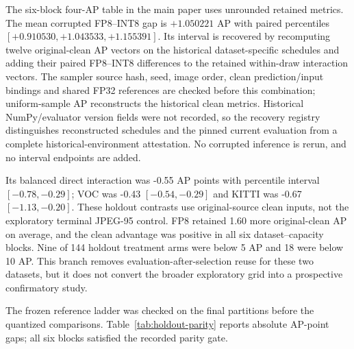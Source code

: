 \documentclass[10pt]{article}
\begin{document}
The six-block four-AP table in the main paper uses unrounded retained metrics.
The mean corrupted FP8--INT8 gap is $+1.050221$ AP with paired percentiles
$[+0.910530,+1.043533,+1.155391]$. Its interval is recovered by recomputing
twelve original-clean AP vectors on the historical dataset-specific schedules
and adding their paired FP8--INT8 differences to the retained within-draw
interaction vectors. The sampler source hash, seed, image order, clean
prediction/input bindings and shared FP32 references are checked before this
combination; uniform-sample AP reconstructs the historical clean metrics.
Historical NumPy/evaluator version fields were not recorded, so the recovery
registry distinguishes reconstructed schedules and the pinned current
evaluation from a complete historical-environment attestation. No corrupted
inference is rerun, and no interval endpoints are added.

Its balanced direct interaction was -0.55 AP points with percentile interval
$[-0.78,-0.29]$; VOC was -0.43 $[-0.54,-0.29]$ and KITTI was -0.67
$[-1.13,-0.20]$. These holdout contrasts use original-source clean inputs, not
the exploratory terminal JPEG-95 control. FP8 retained 1.60 more original-clean AP on average, and the
clean advantage was positive in all six dataset--capacity blocks. Nine of 144
holdout treatment arms were below 5 AP and 18 were below 10 AP. This branch
removes evaluation-after-selection reuse for these two datasets, but it does
not convert the broader exploratory grid into a prospective confirmatory study.

\begin{table}[htbp]
\centering
\caption{Selection-disjoint partition counts. The KITTI final set is a
class-covered subset of the post-selection remainder, not 20\% of the complete
7,481-image labeled universe.}
\label{tab:holdout-splits}
\small
\resizebox{0.88\textwidth}{!}{}
\end{table}

The frozen reference ladder was checked on the final partitions before the
quantized comparisons. Table~\ref{tab:holdout-parity} reports absolute AP-point
gaps; all six blocks satisfied the recorded parity gate.

\begin{table}[htbp]
\centering
\caption{Selection-disjoint reference-ladder parity. Values are absolute
AP-point gaps between the named implementations.}
\label{tab:holdout-parity}
\small
\resizebox{0.9\textwidth}{!}{}
\end{table}
\FloatBarrier
\end{document}
